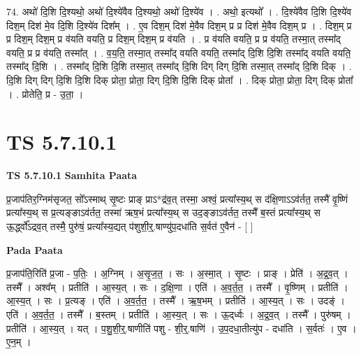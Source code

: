 \documentclass[17pt]{extarticle}
\begin{document}
74. अथो॑ दि॒शि दि॒श्यथो॒ अथो॑ दि॒श्ये॑वैव दि॒श्यथो॒ अथो॑ दि॒श्ये॑व । . अथो॒ इत्यथो᳚ । . दि॒श्ये॑वैव दि॒शि दि॒श्ये॑व दिश॒म् दिश॑ मे॒व दि॒शि दि॒श्ये॑व दिश᳚म् । . ए॒व दिश॒म् दिश॑ मे॒वैव दिश॒म् प्र प्र दिश॑ मे॒वैव दिश॒म् प्र । . दिश॒म् प्र प्र दिश॒म् दिश॒म् प्र व॑यति वयति॒ प्र दिश॒म् दिश॒म् प्र व॑यति । . प्र व॑यति वयति॒ प्र प्र व॑यति॒ तस्मा॒त् तस्मा᳚द् वयति॒ प्र प्र व॑यति॒ तस्मा᳚त् । . व॒य॒ति॒ तस्मा॒त् तस्मा᳚द् वयति वयति॒ तस्मा᳚द् दि॒शि दि॒शि तस्मा᳚द् वयति वयति॒ तस्मा᳚द् दि॒शि । . तस्मा᳚द् दि॒शि दि॒शि तस्मा॒त् तस्मा᳚द् दि॒शि दिग् दिग् दि॒शि तस्मा॒त् तस्मा᳚द् दि॒शि दिक् । . दि॒शि दिग् दिग् दि॒शि दि॒शि दिक् प्रोता॒ प्रोता॒ दिग् दि॒शि दि॒शि दिक् प्रोता᳚ । . दिक् प्रोता॒ प्रोता॒ दिग् दिक् प्रोता᳚ । . प्रोतेति॒ प्र - उ॒ता॒ । \newline
\pagebreak
{}

\section{ TS 5.7.10.1 }

\textbf{TS 5.7.10.1 } \newline
\textbf{Samhita Paata} \newline

प्र॒जाप॑तिर॒ग्निम॑सृजत॒ सो᳚ऽस्माथ् सृ॒ष्टः प्राङ् प्राऽ*द्र॑व॒त् तस्मा॒ अश्वं॒ प्रत्या᳚स्य॒थ् स द॑क्षि॒णाऽऽव॑र्तत॒ तस्मै॑ वृ॒ष्णिं प्रत्या᳚स्य॒थ् स प्र॒त्यङ्ङाऽव॑र्तत॒ तस्मा॑ ऋष॒भं प्रत्या᳚स्य॒थ् स उद॒ङ्ङाऽव॑र्तत॒ तस्मै᳚ ब॒स्तं प्रत्या᳚स्य॒थ् स ऊ॒र्द्ध्वो᳚ऽद्रव॒त् तस्मै॒ पुरु॑षं॒ प्रत्या᳚स्य॒द्यत् प॑शुशी॒र्॒.षाण्यु॑प॒दधा॑ति स॒र्वत॑ ए॒वैन॑ - [  ] \newline

\textbf{Pada Paata} \newline

प्र॒जाप॑ति॒रिति॑ प्र॒जा - प॒तिः॒ । अ॒ग्निम् । अ॒सृ॒ज॒त॒ । सः । अ॒स्मा॒त् । सृ॒ष्टः । प्राङ् । प्रेति॑ । अ॒द्र॒व॒त् । तस्मै᳚ । अश्व᳚म् । प्रतीति॑ । आ॒स्य॒त् । सः । द॒क्षि॒णा । एति॑ । अ॒व॒र्त॒त॒ । तस्मै᳚ । वृ॒ष्णिम् । प्रतीति॑ । आ॒स्य॒त् । सः । प्र॒त्यङ् । एति॑ । अ॒व॒र्त॒त॒ । तस्मै᳚ । ऋ॒ष॒भम् । प्रतीति॑ । आ॒स्य॒त् । सः । उदङ्॑ । एति॑ । अ॒व॒र्त॒त॒ । तस्मै᳚ । ब॒स्तम् । प्रतीति॑ । आ॒स्य॒त् । सः । ऊ॒द्‌र्ध्वः । अ॒द्र॒व॒त् । तस्मै᳚ । पुरु॑षम् । प्रतीति॑ । आ॒स्य॒त् । यत् । प॒शु॒शी॒र्॒.षाणीति॑ पशु - शी॒र्॒.षाणि॑ । उ॒प॒दधा॒तीत्यु॑प - दधा॑ति । स॒र्वतः॑ । ए॒व । ए॒न॒म् ।  \newline
\end{document}
